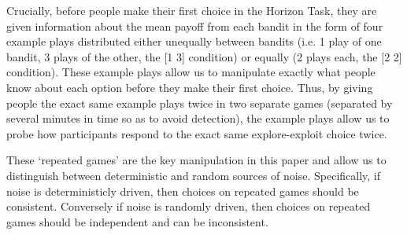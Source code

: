 \documentclass[12pt]{article}
\begin{document}
	Crucially, before people make their first choice in the Horizon Task, they are given information about the mean payoff from each bandit in the form of four example plays distributed either unequally between bandits (i.e. 1 play of one bandit, 3 plays of the other, the [1 3] condition) or equally (2 plays each, the [2 2] condition). These example plays allow us to manipulate exactly what people know about each option before they make their first choice. Thus, by giving people the exact same example plays twice in two separate games (separated by several minutes in time so as to avoid detection), the example plays allow us to probe how participants respond to the exact same explore-exploit choice twice.  
	
	These `repeated games' are the key manipulation in this paper and allow us to distinguish between deterministic and random sources of noise.  Specifically, if noise is deterministicly driven, then choices on repeated games should be consistent. Conversely if noise is randomly driven, then choices on repeated games should be independent and can be inconsistent.
	
\end{document}
